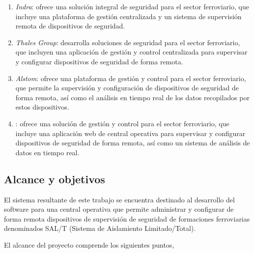 \begin{enumerate}

  \item \textit{Indra}: ofrece una solución integral de seguridad para el sector ferroviario, que incluye una plataforma de gestión centralizada y un sistema de supervisión remota de dispositivos de seguridad.

  \item \textit{Thales Group}: desarrolla soluciones de seguridad para el sector ferroviario, que incluyen una aplicación de gestión y control centralizada para supervisar y configurar dispositivos de seguridad de forma remota.

  \item \textit{Alstom}: ofrece una plataforma de gestión y control para el sector ferroviario, que permite la supervisión y configuración de dispositivos de seguridad de forma remota, así como el análisis en tiempo real de los datos recopilados por estos dispositivos.

  \item {}: ofrece una solución de gestión y control para el sector ferroviario, que incluye una aplicación web de central operativa para supervisar y configurar dispositivos de seguridad de forma remota, así como un sistema de análisis de datos en tiempo real.

\end{enumerate}


\subsection{Alcance y objetivos}

El sistema resultante de este trabajo se encuentra destinado al desarrollo del software para una central operativa que permite administrar y configurar de forma remota dispositivos de supervisión de seguridad de formaciones ferroviarias denominados SAL/T (Sistema de Aislamiento Limitado/Total). 


El alcance del proyecto comprende los siguientes puntos,

